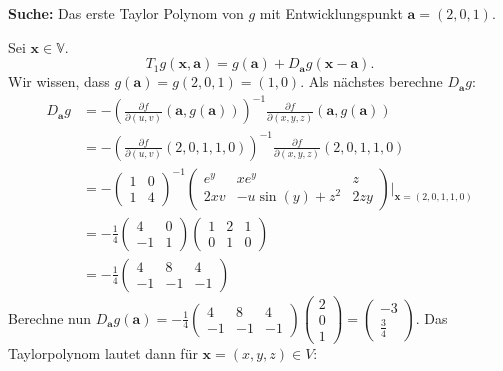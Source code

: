 \documentclass[a4paper]{article}
\begin{document}
\textbf{Suche:} Das erste Taylor Polynom von $g$ mit Entwicklungspunkt $\mathbf a = (2,0,1)$. 

Sei $\mathbf x \in \mathbb V$.
\[
	T_1g(\mathbf x, \mathbf a) = g(\mathbf a) + D_{\mathbf a}g(\mathbf x - \mathbf a).
\]
Wir wissen, dass $g(\mathbf a) = g(2,0,1) = (1,0)$. Als nächstes berechne $D_{\mathbf a}g$:
\begin{align*}
	D_{\mathbf a}g& = -(\frac{\partial f}{\partial(u,v)}(\mathbf a, g(\mathbf a)))^{-1} \frac{\partial f}{\partial (x,y,z)}(\mathbf a, g(\mathbf a)) \\
	& = -(\frac{\partial f}{\partial(u,v)}(2,0,1,1,0))^{-1} \frac{\partial f}{\partial (x,y,z)}(2,0,1,1,0) \\
	&= - \begin{pmatrix}
			1 & 0 \\ 1 & 4
	\end{pmatrix}^{-1} \begin{pmatrix}
		e^y & xe^y & z \\
		2xv & -u\sin(y) + z^2 & 2zy
	\end{pmatrix}\Bigg \vert_{\mathbf x = (2,0,1,1,0)} \\
	&= -\frac{1}{4}\begin{pmatrix}
		4 & 0 \\ -1 & 1
	\end{pmatrix} \begin{pmatrix}
		1 & 2 & 1 \\ 0 & 1 & 0
	\end{pmatrix} \\
	&= -\frac{1}{4}\begin{pmatrix}
		4 & 8 & 4 \\
		-1 & -1 & -1
	\end{pmatrix}
\end{align*}
Berechne nun $D_\mathbf{a}g(\mathbf a) = -\frac{1}{4}\begin{pmatrix}
		4 & 8 & 4 \\
		-1 & -1 & -1
	\end{pmatrix}\begin{pmatrix}
		2 \\ 0 \\ 1
	\end{pmatrix} = \begin{pmatrix}
		-3 \\ \frac{3}{4}
	\end{pmatrix}$. 
Das Taylorpolynom lautet dann für $\mathbf x = (x,y,z) \in V$:
\end{document}
